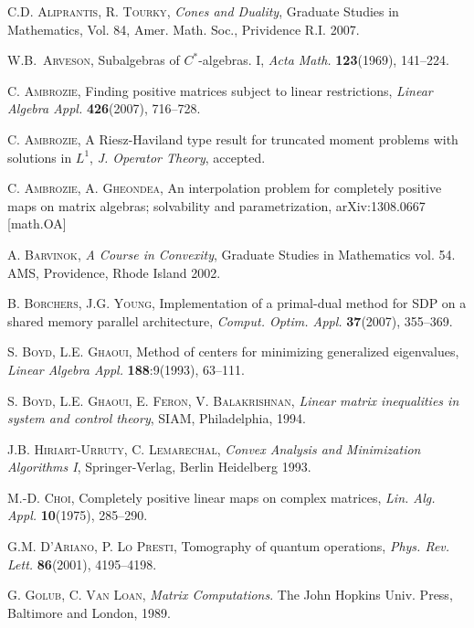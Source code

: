 \documentclass[12pt]{amsart}
\theoremstyle{definition}
\begin{document}
\begin{thebibliography}{99}

 \textsc{C.D. Aliprantis, R. Tourky}, \textit{Cones and 
Duality}, Graduate Studies in Mathematics, Vol. 84, Amer. Math. Soc., Prividence 
R.I. 2007.

 \textsc{W.B.~Arveson}, Subalgebras of $C^*$-algebras. I,  
\textit{Acta Math.}  \textbf{123}(1969), 141--224. 

 \textsc{C. Ambrozie}, Finding positive matrices subject to linear 
restrictions, {\it Linear Algebra Appl.} {\bf 426}(2007), 716--728.

 \textsc{C. Ambrozie},  
A Riesz-Haviland type result for truncated moment problems with solutions in $L^1$, 
{\it J. Operator Theory}, accepted.

\textsc{C. Ambrozie, A. Gheondea}, An interpolation problem for 
completely positive maps on matrix algebras; solvability and parametrization,
arXiv:1308.0667 [math.OA]

 \textsc{A. Barvinok}, {\it A Course in Convexity}, Graduate Studies 
in Mathematics vol. 54. AMS, Providence, Rhode Island 2002.

 \textsc{B. Borchers, J.G. Young},
Implementation of a primal-dual method for SDP on a shared memory parallel
architecture, \textit{Comput. Optim. Appl.} \textbf{37}(2007), 355--369.

 \textsc{S. Boyd, L.E. Ghaoui},  Method of centers for minimizing generalized eigenvalues, {\it Linear Algebra Appl.} \textbf{188}:9(1993), 63--111.

 \textsc{S. Boyd, L.E. Ghaoui, E. Feron, V. Balakrishnan},   {\it Linear matrix inequalities in system and control theory}, SIAM, Philadelphia, 1994.

 \textsc{J.B. Hiriart-Urruty, C. Lemarechal}, {\it Convex Analysis and Minimization Algorithms I}, Springer-Verlag, Berlin Heidelberg 1993.

 \textsc{M.-D. Choi}, Completely positive linear maps on 
complex matrices,  \textit{Lin. Alg. Appl.}  \textbf{10}(1975), 
285--290.

 \textsc{G.M. D'Ariano, P. Lo Presti}, 
Tomography of quantum operations, \textit{Phys. Rev. Lett.} \textbf{86}(2001), 
4195--4198.

 \textsc{G. Golub, C. Van Loan}, {\it Matrix Computations}. 
The John Hopkins Univ. Press, Baltimore and London, 1989.


\end{thebibliography}
\end{document}

